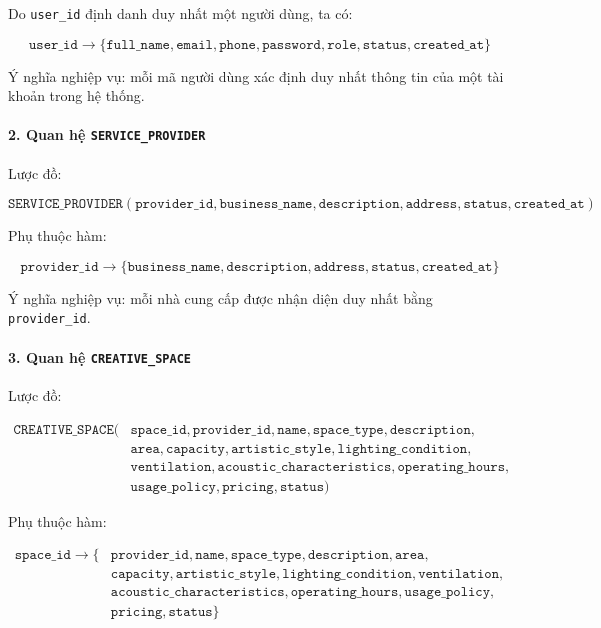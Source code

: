 Do \texttt{user\_id} định danh duy nhất một người dùng, ta có:

$$ \texttt{user\_id} \rightarrow \{ \texttt{full\_name}, \texttt{email}, \texttt{phone}, \texttt{password}, \texttt{role}, \texttt{status}, \texttt{created\_at} \} $$

Ý nghĩa nghiệp vụ: mỗi mã người dùng xác định duy nhất thông tin của một tài khoản trong hệ thống.

\paragraph{2. Quan hệ \texttt{SERVICE\_PROVIDER}}\mbox{}\par

Lược đồ:

$$ \texttt{SERVICE\_PROVIDER}(\texttt{provider\_id}, \texttt{business\_name}, \texttt{description}, \texttt{address}, \texttt{status}, \texttt{created\_at}) $$

Phụ thuộc hàm:

$$
\texttt{provider\_id}
\rightarrow
\{
\texttt{business\_name},
\texttt{description},
\texttt{address},
\texttt{status},
\texttt{created\_at}
\}
$$

Ý nghĩa nghiệp vụ: mỗi nhà cung cấp được nhận diện duy nhất bằng \texttt{provider\_id}.

\paragraph{3. Quan hệ \texttt{CREATIVE\_SPACE}}\mbox{}\par

Lược đồ:

$$
\begin{aligned}
\texttt{CREATIVE\_SPACE}( & \texttt{space\_id}, \texttt{provider\_id}, \texttt{name}, \texttt{space\_type}, \texttt{description}, \\
& \texttt{area}, \texttt{capacity}, \texttt{artistic\_style}, \texttt{lighting\_condition}, \\
& \texttt{ventilation}, \texttt{acoustic\_characteristics}, \texttt{operating\_hours}, \\
& \texttt{usage\_policy}, \texttt{pricing}, \texttt{status} )
\end{aligned}
$$

Phụ thuộc hàm:

$$
\begin{aligned}
\texttt{space\_id} \rightarrow \{ & \texttt{provider\_id}, \texttt{name}, \texttt{space\_type}, \texttt{description}, \texttt{area}, \\
& \texttt{capacity}, \texttt{artistic\_style}, \texttt{lighting\_condition}, \texttt{ventilation}, \\
& \texttt{acoustic\_characteristics}, \texttt{operating\_hours}, \texttt{usage\_policy}, \\
& \texttt{pricing}, \texttt{status} \}
\end{aligned}
$$

